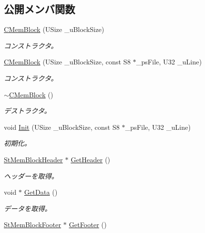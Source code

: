 \subsection*{公開メンバ関数}
\begin{DoxyCompactItemize}
\item 
\hyperlink{class_c_mem_block_a9a60b207cc79af9bd8ebd17c0fa8d3d3}{C\+Mem\+Block} (U\+Size \+\_\+u\+Block\+Size)
\begin{DoxyCompactList}\small\item\em コンストラクタ。 \end{DoxyCompactList}\item 
\hyperlink{class_c_mem_block_a3b5ef8f0163ad94f03d0342cb4a27f06}{C\+Mem\+Block} (U\+Size \+\_\+u\+Block\+Size, const S8 $\ast$\+\_\+ps\+File, U32 \+\_\+u\+Line)
\begin{DoxyCompactList}\small\item\em コンストラクタ。 \end{DoxyCompactList}\item 
\hyperlink{class_c_mem_block_a22ed0b5231e5e9342d9fd2ac3af63dd3}{$\sim$\+C\+Mem\+Block} ()
\begin{DoxyCompactList}\small\item\em デストラクタ。 \end{DoxyCompactList}\item 
void \hyperlink{class_c_mem_block_ad87158f4e8d752cca38e7569b31e5352}{Init} (U\+Size \+\_\+u\+Block\+Size, const S8 $\ast$\+\_\+ps\+File, U32 \+\_\+u\+Line)
\begin{DoxyCompactList}\small\item\em 初期化。 \end{DoxyCompactList}\item 
\hyperlink{struct_c_mem_block_1_1_st_mem_block_header}{St\+Mem\+Block\+Header} $\ast$ \hyperlink{class_c_mem_block_aa040c253df1f33bcb7b46744d7899926}{Get\+Header} ()
\begin{DoxyCompactList}\small\item\em ヘッダーを取得。 \end{DoxyCompactList}\item 
void $\ast$ \hyperlink{class_c_mem_block_a17d021cfca9eed9ef876e7e4e83d0a37}{Get\+Data} ()
\begin{DoxyCompactList}\small\item\em データを取得。 \end{DoxyCompactList}\item 
\hyperlink{struct_c_mem_block_1_1_st_mem_block_footer}{St\+Mem\+Block\+Footer} $\ast$ \hyperlink{class_c_mem_block_ab7fb22f0bac9e48ce23b0a84ee073efa}{Get\+Footer} ()

\end{DoxyCompactItemize}
